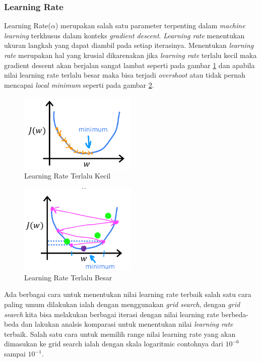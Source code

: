 \subsubsection{Learning Rate} \label{II.learningrate}
Learning Rate($\alpha$) merupakan salah satu parameter terpenting dalam \textit{machine learning} terkhusus dalam konteks \textit{gradient descent}\cite{igiri2015effect}. \textit{ Learning rate} menentukan ukuran langkah yang dapat diambil pada setiap iterasinya\cite{zeiler2012adadelta}. Menentukan \textit{learning rate} merupakan hal yang krusial dikarenakan jika \textit{learning rate} terlalu kecil maka gradient descent akan berjalan sangat lambat seperti pada gambar \ref{fig:2.learningratekecil} dan apabila nilai learning rate terlalu besar maka bisa terjadi \textit{overshoot} atau tidak pernah mencapai \textit{local minimum} seperti pada gambar \ref{fig:2.learningratebesar}\cite{igiri2015effect}.
\begin{figure}[H] %
    \centering
    \includegraphics[width=0.5\textwidth]{figure/Learning rate kecil.png}
    \caption{Learning Rate Terlalu Kecil}
    \label{fig:2.learningratekecil}
\end{figure}
\begin{figure}[H] %
    \centering
    \includegraphics[width=0.5\textwidth]{figure/Learning rate besar.png}
    \caption{Learning Rate Terlalu Besar}
    \label{fig:2.learningratebesar}
\end{figure}
Ada berbagai cara untuk menentukan nilai learning rate terbaik salah satu cara paling umum dilakukan ialah dengan menggunakan \textit{grid search}, dengan \textit{grid search} kita bisa melakukan berbagai iterasi dengan nilai learning rate berbeda-beda dan lakukan analsis komparasi untuk menentukan nilai \textit{learning rate} terbaik\cite{smith2018disciplined}. Salah satu cara untuk memilih range nilai learning rate yang akan dimasukan ke grid search ialah dengan skala logaritmic contohnya dari $10^{-6}$ sampai $10^{-1}$\cite{smith2018disciplined}.


